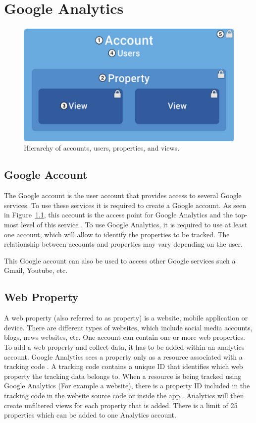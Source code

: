 \chapter{Google Analytics}
\label{chap:ga}


\begin{figure}[h]
  \centering
  \includegraphics[width=.5\textwidth]{figures/Hierarchy.png}
  \caption[Hierarchy]{Hierarchy of accounts, users, properties, and views.}
  \label{fig:Hierarchy}
\end{figure}
\section{Google Account}
The Google account is the user account that provides access to several Google services. To use these services it is required to create a Google account. As seen in Figure~\ref{fig:Hierarchy}, this account is the access point for Google Analytics and the top-most level of this service \cite{Hiera14:online}. To use Google Analytics, it is required to use at least one account, which will allow to identify the properties to be tracked. The relationship between accounts and properties may vary depending on the user. 


This Google account can also be used to access other Google services such a Gmail, Youtube, etc.
\section{Web Property}
\label{sec:webProperty}
A web property (also referred to as property) is a website, mobile application or device. There are different types of websites, which include social media accounts, blogs, news websites, etc. One account can contain one or more web properties. To add a web property and collect data, it has to be added within an analytics account.
Google Analytics sees a property only as a resource associated with a tracking code \cite{About27:online}. A tracking code contains a unique ID that identifies which web property the tracking data belongs to. When a resource is being tracked using Google Analytics (For example a website), there is a property ID included in the tracking code in the website source code or inside the app \cite{About27:online}. 
Analytics will then create unfiltered views for each property that is added. There is a limit of 25 properties which can be added to one Analytics account.

